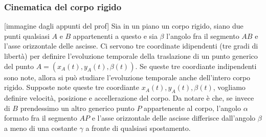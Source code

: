 \subsubsection{Cinematica del corpo rigido}
[immagine dagli appunti del prof]\newline
Sia in un piano un corpo rigido, siano due punti qualsiasi $A$ e $B$ appartenenti a questo e sia $\beta$ l'angolo fra il segmento $AB$ e l'asse orizzontale delle ascisse.\newline
Ci servono tre coordinate idipendenti (tre gradi di libertà) per definire l'evoluzione temporale della traslazione di un punto generico del punto $A = (x_A(t), y_A(t), \beta(t))$. Se queste tre coordiante indipendenti sono note, allora si può studiare l'evoluzione temporale anche dell'intero corpo rigido.\newline
Supposte note queste tre coordiante $x_A(t), y_A(t), \beta(t)$, vogliamo definire velocità, posizione e accellerazione del corpo.\newline
Da notare è che, se invece di $B$ prendessimo un altro generico punto $P$ appartenente al corpo, l'angolo $\alpha$ formato fra il segmento $AP$ e l'asse orizzontale delle ascisse differisce dall'angolo $\beta$ a meno di una costante $\gamma$ a fronte di qualsiasi spostamento.\newline
